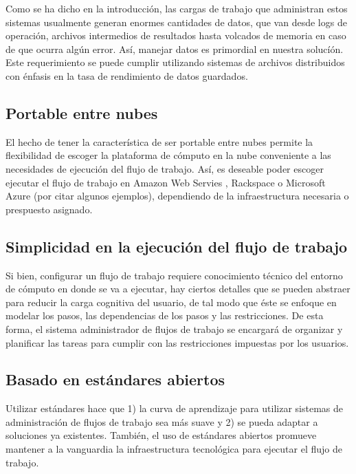 Como se ha dicho en la introducción, las cargas de trabajo que administran estos sistemas usualmente generan enormes cantidades de datos, que van desde logs de operación, archivos intermedios de resultados hasta volcados de memoria en caso de que ocurra algún error. Así, manejar datos es primordial en nuestra solucíón. Este requerimiento se puede cumplir utilizando sistemas de archivos distribuidos con énfasis en la tasa de rendimiento de datos guardados.


\subsection{Portable entre nubes}

El hecho de tener la característica de ser portable entre nubes permite la flexibilidad de escoger la plataforma de cómputo en la nube conveniente a las necesidades de ejecución del flujo de trabajo. Así, es deseable poder escoger ejecutar el flujo de trabajo en Amazon Web Servies \cite{amazon2016aws}, Rackspace \cite{racksapce2016managedcloud} o Microsoft Azure \cite{microsoft2015azure} (por citar algunos ejemplos), dependiendo de la infraestructura necesaria o prespuesto asignado.


\subsection{Simplicidad en la ejecuci\'on del flujo de trabajo}

Si bien, configurar un flujo de trabajo requiere conocimiento técnico del entorno de cómputo en donde se va a ejecutar, hay ciertos detalles que se pueden abstraer para reducir la carga cognitiva del usuario, de tal modo que éste se enfoque en modelar los pasos, las dependencias de los pasos y las restricciones. De esta forma, el sistema administrador de flujos de trabajo se encargará de organizar y planificar las tareas para cumplir con las restricciones impuestas por los usuarios.


\subsection{Basado en estándares abiertos}

Utilizar estándares hace que 1) la curva de aprendizaje para utilizar sistemas de administración de flujos de trabajo sea más suave y 2) se pueda adaptar a soluciones ya existentes. También, el uso de estándares abiertos promueve mantener a la vanguardia la infraestructura tecnológica para ejecutar el flujo de trabajo.


